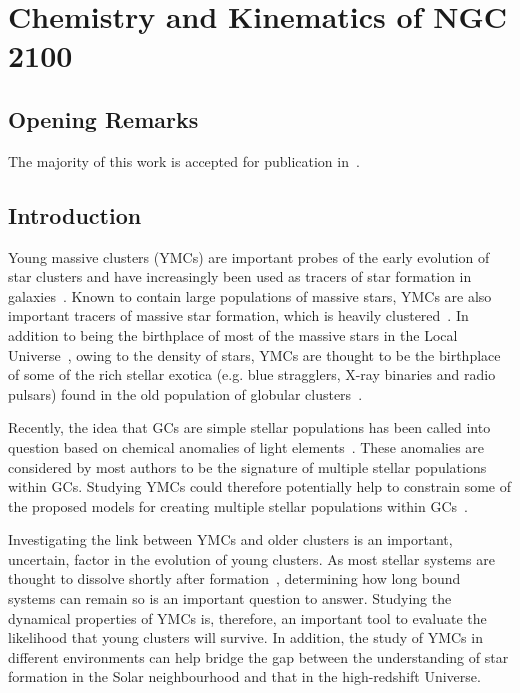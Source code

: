 \chapter{Chemistry and Kinematics of NGC\,2100}\label{ch:ngc2100}

\section{Opening Remarks} %
\label{sec:opening_remarks}

The majority of this work is accepted for publication in~\cite{2016arXiv160202702P}.

\section{Introduction} %
\label{sec:introduction}

Young massive clusters (YMCs\footnotemark) are important probes of the early evolution of star clusters and have increasingly been used as tracers of star formation in galaxies~\citep[e.g.][]{1995AJ....109..960W,1997AJ....114.2381M,1999AJ....118..752Z}.
Known to contain large populations of massive stars, YMCs are also important tracers of massive star formation, which is heavily clustered~\citep{2003ARA&A..41...57L,2005A&A...437..247D,2007MNRAS.380.1271P}.
In addition to being the birthplace of most of the massive stars in the Local Universe~\citep[$>200\,$M$_{\odot}$ stars in R136;][]{2010MNRAS.408..731C}, owing to the density of stars, YMCs are thought to be the birthplace of some of the rich stellar exotica
(e.g. blue stragglers, X-ray binaries and radio pulsars) found in the old population of globular clusters~\citep[GCs;][]{2010ARA&A..48..431P}.


Recently, the idea that GCs are simple stellar populations has been called into question based on chemical anomalies of light elements~\citep[C, N, O, Na and Al; e.g.][]{2012A&ARv..20...50G}.
These anomalies are considered by most authors to be the signature of multiple stellar populations within GCs.
Studying YMCs could therefore potentially help to constrain some of the proposed models for creating multiple stellar populations within GCs~\citep[e.g.][]{2014MNRAS.441.2754C}.

Investigating the link between YMCs and older clusters is an important, uncertain, factor in the evolution of young clusters.
As most stellar systems are thought to dissolve shortly after formation~\citep{2003ARA&A..41...57L}, determining how long bound systems can remain so is an important question to answer.
Studying the dynamical properties of YMCs is, therefore, an important tool to evaluate the likelihood that young clusters will survive.
In addition, the study of YMCs in different environments can help bridge the gap between the understanding of star formation in the Solar neighbourhood and that in the high-redshift Universe.


